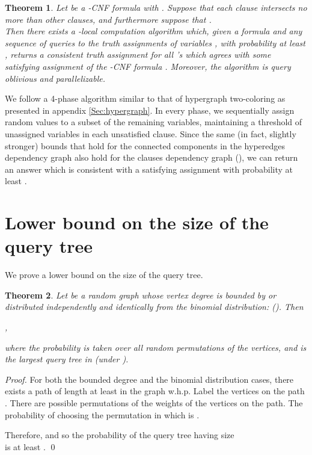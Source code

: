 \documentclass[english, oribibl]{llncs}
\newtheorem{theorem}{Theorem}[section]
\newenvironment{sketch}{\noindent{\bf Proof [Sketch]:~~}}{}
\begin{document}
\begin{theorem}
Let  be a -CNF formula with . 
Suppose that each clause intersects no more than  other clauses,
and furthermore suppose that .\\
Then there exists a -local computation algorithm which, given a formula  and any sequence of
queries to the truth assignments of variables , 
with probability at least ,
returns a consistent truth assignment for all 's which agrees with some 
satisfying assignment of the -CNF formula . 
Moreover, the algorithm is query oblivious and parallelizable. 
\end{theorem}



\begin{sketch}
We follow a 4-phase algorithm similar to that of 
hypergraph two-coloring as presented in appendix \ref{Sec:hypergraph}.
In every phase, we sequentially assign random values to a subset of the remaining variables,
maintaining a threshold of  unassigned variables in each unsatisfied clause.
Since the same (in fact, slightly stronger) bounds that hold for the connected components
in the hyperedges dependency graph also hold for the clauses dependency graph (\cite{RTVX11b}),
we can return an answer which is consistent with a satisfying assignment with probability at least .
\end{sketch}








\section{Lower bound on the size of the query tree}
\label{section:lower_bound}
We prove a lower bound on the size of the query tree.
\begin{theorem}
\label{thm:lower_bound}
Let  be a random graph whose vertex degree is bounded by  or distributed independently and identically from the binomial distribution:   (). Then
\begin{center}
,
\end{center}
where the probability is taken over all random permutations  of the vertices, and  is the largest query tree in  (under ).
\end{theorem}\begin{proof}

For both the bounded degree and the binomial distribution cases, there exists a path of length at least  in the graph  w.h.p. Label the vertices on the path . There are  possible permutations of the weights of the vertices on the path. The probability of choosing the permutation in which  is .

Therefore,  and so the probability of the query tree having size\\  is at least . \qed

\end{proof}
\end{document}

